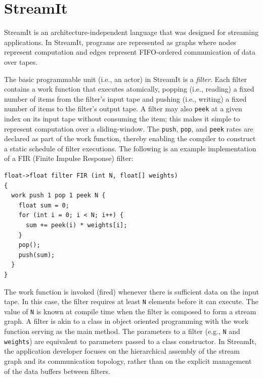 \section{StreamIt}
\label{sec:streamit}

StreamIt  is   an  architecture-independent  language that was
designed for  streaming applications. In StreamIt, programs are
represented as graphs where  nodes represent  computation and edges
represent FIFO-ordered communication of data over tapes.

The  basic programmable  unit (i.e., an actor) in  StreamIt is a {\it
filter}.   Each filter contains  a work  function that executes
atomically,  popping (i.e., reading)  a fixed number  of items  from
the  filter's input  tape and pushing (i.e., writing) a fixed number
of items to the filter's output tape.  A filter  may also {\tt peek} at
a given index  on its input tape without  consuming  the  item;  this
makes  it  simple  to  represent computation over a
sliding-window.   The {\tt push}, {\tt pop}, and {\tt peek} rates are
declared as part  of  the work  function,  thereby enabling  the
compiler    to construct a static schedule of filter executions. The
following is an example implementation of a FIR   (Finite Impulse
Response)  filter: 
{\small
\begin{verbatim}
float->float filter FIR (int N, float[] weights) 
{
  work push 1 pop 1 peek N {
    float sum = 0;
    for (int i = 0; i < N; i++) {
      sum += peek(i) * weights[i];
    }
    pop();
    push(sum);
  }
}
\end{verbatim}}

The work function is invoked (fired) whenever there is sufficient data
on the input tape. In this case, the filter requires at least
\texttt{N} elements before it can execute. The value of \texttt{N} is
known at compile time when the filter is composed to form a stream
graph. A filter is akin to a class in object oriented programming
with the work function serving as the main method. The parameters
to a filter (e.g., \texttt{N} and \texttt{weights}) are equivalent to
parameters passed to a class constructor. In StreamIt, the
application developer focuses on the hierarchical assembly of the
stream graph and its communication topology, rather than on the 
explicit management of the data buffers between filters.

